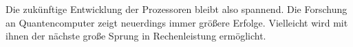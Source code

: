 \documentclass[12pt]{article}
\begin{document}
\par\bigskip\noindent Die zukünftige Entwicklung der Prozessoren bleibt also spannend. Die Forschung an Quantencomputer zeigt neuerdings immer größere Erfolge. Vielleicht wird mit ihnen der nächste große Sprung in Rechenleistung ermöglicht. 
\newpage
\pagestyle{empty}

\listoffigures
\newpage
{}
\listoftables
\newpage
{}
\listofcodes
\newpage
{}

\end{document}
